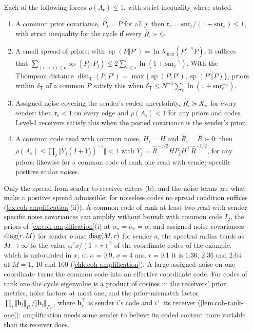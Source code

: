 \begin{proposition}\label{prop:coh-no-amplification}
Each of the following forces $\rho(A_{\mathfrak c})\le1$, with strict inequality where stated.
\begin{enumerate}\renewcommand{\labelenumi}{(\alph{enumi})}
\item A common prior covariance, $P_j=P$ for all $j$: then $\mathfrak r_e=\mathrm{snr}_e/(1+\mathrm{snr}_e)\le1$, with strict inequality for the cycle if every $\hat R_i\succ0$.
\item A small spread of priors: with $\operatorname{sp}(P\Vert P')=\ln\lambda_{\max}(P'^{-1}P)$, it suffices that $\sum_{(i\to j)\in\mathfrak c}\operatorname{sp}(P_i\Vert P_j)\le2\sum_{e\in\mathfrak c}\ln(1+\mathrm{snr}_e^{-1})$. With the Thompson distance $\operatorname{dist}_{\mathrm T}(P,P')=\max\{\operatorname{sp}(P\Vert P'),\operatorname{sp}(P'\Vert P)\}$, priors within $\delta_{\mathrm T}$ of a common $P$ satisfy this when $\delta_{\mathrm T}\le N^{-1}\sum_e\ln(1+\mathrm{snr}_e^{-1})$.
\item Assigned noise covering the sender's coded uncertainty, $\hat R_i\succeq X_{ii}$ for every sender: then $\mathfrak r_e<1$ on every edge and $\rho(A_{\mathfrak c})<1$ for any priors and codes. Level-1 receivers satisfy this when the posted covariance is the sender's prior.
\item A common code read with common noise, $H_i=H$ and $\hat R_i=\hat R\succ0$: then $\rho(A_{\mathfrak c})\le\prod_j\Vert Y_j(I+Y_j)^{-1}\Vert<1$ with $Y_j=\hat R^{-1/2}HP_jH^\top\hat R^{-1/2}$, for any priors; likewise for a common code of rank one read with sender-specific positive scalar noises.
\end{enumerate}
\end{proposition}

Only the spread from sender to receiver enters (b), and the noise terms are what make a positive spread admissible; for noiseless codes no spread condition suffices (\cref{ex:coh-amplification}(ii)). A common code of rank at least two read with sender-specific noise covariances can amplify without bound: with common code $I_2$, the priors of \cref{ex:coh-amplification}(i) at $\alpha_a=\alpha_b=\alpha$, and assigned noise covariances $\operatorname{diag}(r,M)$ for sender $b$ and $\operatorname{diag}(M,r)$ for sender $a$, the spectral radius tends as $M\to\infty$ to the value $\alpha^2x/(1+r)^2$ of the coordinate codes of the example, which is unbounded in $x$; at $\alpha=0.9$, $x=4$ and $r=0.1$ it is $1.36$, $2.36$ and $2.64$ at $M=1$, $10$ and $100$ (\cref{chk:coh-amplification}). A large assigned noise on one coordinate turns the common code into an effective coordinate code. For codes of rank one the cycle eigenvalue is a product of cosines in the receivers' prior metrics, noise factors at most one, and the prior-mismatch factor $\prod_i\Vert\bm h_i\Vert_{P_i}/\Vert\bm h_i\Vert_{P_{i^+}}$, where $\bm h_i^\top$ is sender $i$'s code and $i^+$ its receiver (\cref{lem:coh-rank-one}): amplification needs some sender to believe its coded content more variable than its receiver does.

